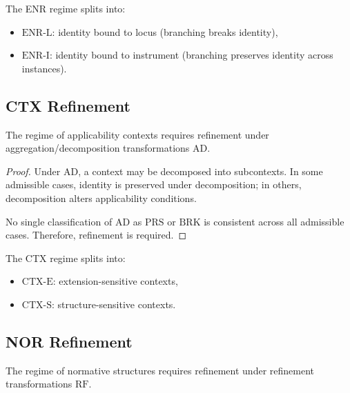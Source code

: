 \begin{definition}
\label{def:enr_refinement}
The ENR regime splits into:
\begin{itemize}
\item $\mathrm{ENR\mbox{-}L}$: identity bound to locus (branching breaks identity),
\item $\mathrm{ENR\mbox{-}I}$: identity bound to instrument (branching preserves identity across instances).
\end{itemize}
\end{definition}

\subsection{CTX Refinement}

\begin{proposition}
\label{prop:ctx_split}
The regime of applicability contexts requires refinement
under aggregation/decomposition transformations $\mathrm{AD}$.
\end{proposition}

\begin{proof}
Under $\mathrm{AD}$, a context may be decomposed into subcontexts.
In some admissible cases, identity is preserved under decomposition;
in others, decomposition alters applicability conditions.

No single classification of $\mathrm{AD}$ as $\mathrm{PRS}$ or $\mathrm{BRK}$
is consistent across all admissible cases.
Therefore, refinement is required.
\end{proof}

\begin{definition}
\label{def:ctx_refinement}
The CTX regime splits into:
\begin{itemize}
\item $\mathrm{CTX\mbox{-}E}$: extension-sensitive contexts,
\item $\mathrm{CTX\mbox{-}S}$: structure-sensitive contexts.
\end{itemize}
\end{definition}

\subsection{NOR Refinement}

\begin{proposition}
\label{prop:nor_split}
The regime of normative structures requires refinement
under refinement transformations $\mathrm{RF}$.
\end{proposition}

